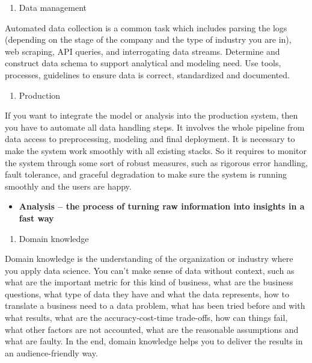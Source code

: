 \documentclass[12pt,]{krantz}
\providecommand{\tightlist}{%
  \setlength{\itemsep}{0pt}\setlength{\parskip}{0pt}}
\begin{document}
\begin{enumerate}
\def\labelenumi{(\arabic{enumi})}
\setcounter{enumi}{1}
\tightlist
\item
  Data management
\end{enumerate}

Automated data collection is a common task which includes parsing the logs (depending on the stage of the company and the type of industry you are in), web scraping, API queries, and interrogating data streams. Determine and construct data schema to support analytical and modeling need. Use tools, processes, guidelines to ensure data is correct, standardized and documented.

\begin{enumerate}
\def\labelenumi{(\arabic{enumi})}
\setcounter{enumi}{2}
\tightlist
\item
  Production
\end{enumerate}

If you want to integrate the model or analysis into the production system, then you have to automate all data handling steps. It involves the whole pipeline from data access to preprocessing, modeling and final deployment. It is necessary to make the system work smoothly with all existing stacks. So it requires to monitor the system through some sort of robust measures, such as rigorous error handling, fault tolerance, and graceful degradation to make sure the system is running smoothly and the users are happy.

\begin{itemize}
\tightlist
\item
  \textbf{Analysis -- the process of turning raw information into insights in a fast way}
\end{itemize}

\begin{enumerate}
\def\labelenumi{(\arabic{enumi})}
\tightlist
\item
  Domain knowledge
\end{enumerate}

Domain knowledge is the understanding of the organization or industry where you apply data science. You can't make sense of data without context, such as what are the important metric for this kind of business, what are the business questions, what type of data they have and what the data represents, how to translate a business need to a data problem, what has been tried before and with what results, what are the accuracy-cost-time trade-offs, how can things fail, what other factors are not accounted, what are the reasonable assumptions and what are faulty. In the end, domain knowledge helps you to deliver the results in an audience-friendly way.
\end{document}
